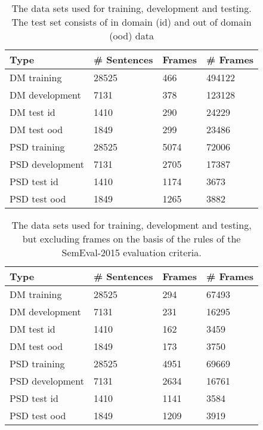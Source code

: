 \begin{table}
    \centering
    \smaller[0.2]
    \begin{tabular}{@{}llll@{}}
        \toprule
        \textbf{Type} & \textbf{\# Sentences} & \textbf{Frames} & \textbf{\# Frames} \\
        \midrule
        DM training & 28525 & 466 & 494122 \\
        DM development & 7131 & 378 & 123128 \\
        DM test id & 1410 & 290 & 24229 \\
        DM test ood & 1849 & 299 & 23486 \\
        \midrule
        PSD training & 28525 & 5074 & 72006 \\
        PSD development & 7131 & 2705 & 17387 \\
        PSD test id & 1410 & 1174 & 3673 \\
        PSD test ood & 1849 & 1265 & 3882 \\
        \bottomrule
    \end{tabular}
    \caption{The data sets used for training, development and testing. The test set consists of in domain (id) and out of domain (ood) data}
    \label{table:split}
\end{table}

\begin{table}
    \centering
    \smaller[0.2]
    \begin{tabular}{@{}llll@{}}
        \toprule
        \textbf{Type} & \textbf{\# Sentences} & \textbf{Frames} & \textbf{\# Frames} \\
        \midrule
        DM training & 28525 & 294 & 67493 \\
        DM development & 7131 & 231 & 16295 \\
        DM test id & 1410 & 162 & 3459 \\
        DM test ood & 1849 & 173 & 3750 \\
        \midrule
        PSD training & 28525 & 4951 & 69669 \\
        PSD development & 7131 & 2634 & 16761 \\
        PSD test id & 1410 & 1141 & 3584 \\
        PSD test ood & 1849  & 1209 & 3919 \\
        \bottomrule
    \end{tabular}
    \caption{The data sets used for training, development and testing, but excluding frames on the basis of the rules of the SemEval-2015 evaluation criteria.}
    \label{table:split:VandPred}
\end{table}


